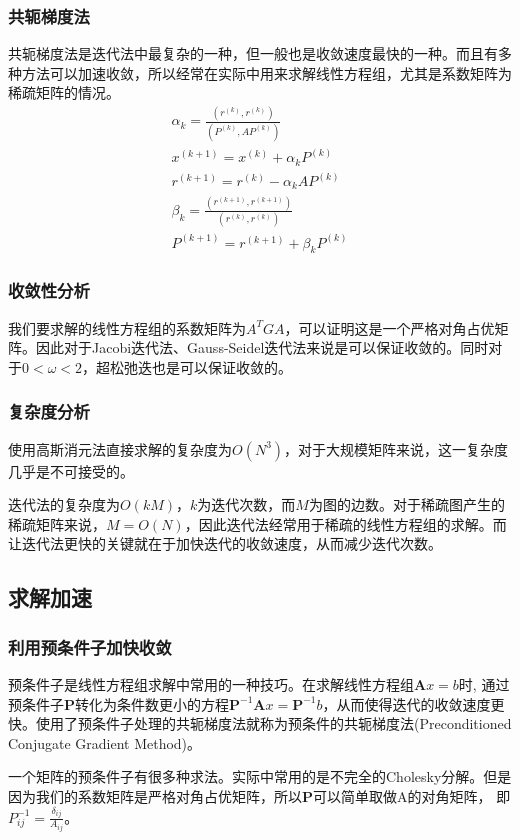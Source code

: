 \documentclass[UTF8,11pt]{report}
\begin{document}
\subsubsection{共轭梯度法}
共轭梯度法是迭代法中最复杂的一种，但一般也是收敛速度最快的一种。而且有多种方法可以加速收敛，所以经常在实际中用来求解线性方程组，尤其是系数矩阵为稀疏矩阵的情况。
\begin{align}
	\alpha_k=\frac{(r^{(k)},r^{(k)})}{(P^{(k)},AP^{(k)})}\\
	x^{(k+1)}=x^{(k)}+\alpha_kP^{(k)}\\
	r^{(k+1)}=r^{(k)}-\alpha_k AP^{(k)}\\
	\beta_k=\frac{(r^{(k+1)}, r^{(k+1)})}{(r^{(k)}, r^{(k)})}\\
	P^{(k+1)}=r^{(k+1)}+\beta_k P^{(k)}
\end{align}
	\subsubsection{收敛性分析}
我们要求解的线性方程组的系数矩阵为$A^TGA$，可以证明这是一个严格对角占优矩阵。因此对于Jacobi迭代法、Gauss-Seidel迭代法来说是可以保证收敛的。同时对于$0<\omega<2$，超松弛迭也是可以保证收敛的。
\subsubsection{复杂度分析}
使用高斯消元法直接求解的复杂度为$O(N^3)$，对于大规模矩阵来说，这一复杂度几乎是不可接受的。

迭代法的复杂度为$O(kM)$，$k$为迭代次数，而$M$为图的边数。对于稀疏图产生的稀疏矩阵来说，$M=O(N)$，因此迭代法经常用于稀疏的线性方程组的求解。而让迭代法更快的关键就在于加快迭代的收敛速度，从而减少迭代次数。
\subsection{求解加速}
\subsubsection{利用预条件子加快收敛}
预条件子是线性方程组求解中常用的一种技巧。在求解线性方程组$\mathbf{A}x=b$时, 通过预条件子$\mathbf{P}$转化为条件数更小的方程$\mathbf{P}^{-1}\mathbf{A}x=\mathbf{P}^{-1}b$，从而使得迭代的收敛速度更快。使用了预条件子处理的共轭梯度法就称为预条件的共轭梯度法(Preconditioned Conjugate Gradient Method)。

一个矩阵的预条件子有很多种求法。实际中常用的是不完全的Cholesky分解。但是因为我们的系数矩阵是严格对角占优矩阵，所以$\mathbf{P}$可以简单取做A的对角矩阵， 即$P^{-1}_{ij} = \frac{\delta_{ij}}{A_{ij}}$。
\end{document}

